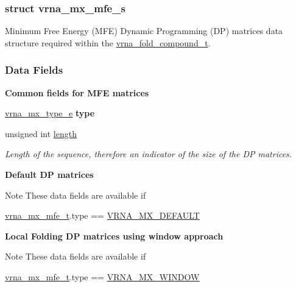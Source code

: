 \subsubsection{struct vrna\+\_\+mx\+\_\+mfe\+\_\+s}
Minimum Free Energy (M\+FE) Dynamic Programming (DP) matrices data structure required within the \hyperlink{group__fold__compound_ga1b0cef17fd40466cef5968eaeeff6166}{vrna\+\_\+fold\+\_\+compound\+\_\+t}. \subsubsection*{Data Fields}
\begin{Indent}\textbf{ Common fields for M\+FE matrices}\par
\begin{DoxyCompactItemize}
\item 
\mbox{\label{group__dp__matrices_a468680aa937b664d453075108d976ae2}} 
\hyperlink{group__dp__matrices_ga6042ea1d58d01931e959791be6d89343}{vrna\+\_\+mx\+\_\+type\+\_\+e} {\bfseries type}
\item 
\mbox{\label{group__dp__matrices_a1f92a8406fc1fb721dbf9193c34ad826}} 
unsigned int \hyperlink{group__dp__matrices_a1f92a8406fc1fb721dbf9193c34ad826}{length}
\begin{DoxyCompactList}\small\item\em Length of the sequence, therefore an indicator of the size of the DP matrices. \end{DoxyCompactList}\end{DoxyCompactItemize}
\end{Indent}
\begin{Indent}\textbf{ Default DP matrices}\par
{\em \begin{DoxyNote}{Note}
These data fields are available if 
\begin{DoxyCode}
\hyperlink{group__dp__matrices_structvrna__mx__mfe__s}{vrna\_mx\_mfe\_t}.type == \hyperlink{group__dp__matrices_gga6042ea1d58d01931e959791be6d89343aafa2568956dab79595521e20c49a5f75}{VRNA\_MX\_DEFAULT} 
\end{DoxyCode}
 
\end{DoxyNote}
}\end{Indent}
\begin{Indent}\textbf{ Local Folding DP matrices using window approach}\par
{\em \begin{DoxyNote}{Note}
These data fields are available if 
\begin{DoxyCode}
\hyperlink{group__dp__matrices_structvrna__mx__mfe__s}{vrna\_mx\_mfe\_t}.type == \hyperlink{group__dp__matrices_gga6042ea1d58d01931e959791be6d89343a2ea5d5947f6ec02544934b0ff2785e99}{VRNA\_MX\_WINDOW} 
\end{DoxyCode}
 
\end{DoxyNote}
}\end{Indent}

